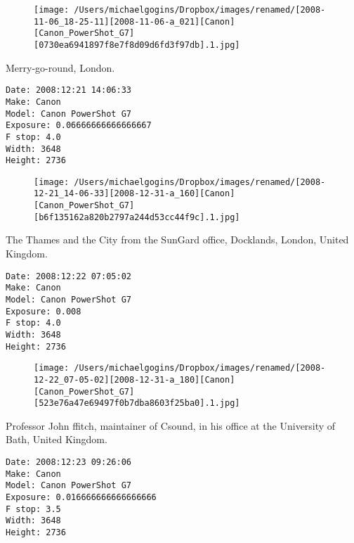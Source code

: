 \documentclass[11pt,letter,DIV=14,paper=landscape]{scrbook}
\begin{document}
\begin{figure}
\texttt{[image: /Users/michaelgogins/Dropbox/images/renamed/[2008-11-06\_18-25-11][2008-11-06-a\_021][Canon][Canon\_PowerShot\_G7][0730ea6941897f8e7f8d09d6fd3f97db].1.jpg]}
\end{figure}
    
\clearpage
\noindent Merry-go-round, London.
\noindent
\begin{lstlisting}
Date: 2008:12:21 14:06:33
Make: Canon
Model: Canon PowerShot G7
Exposure: 0.06666666666666667
F stop: 4.0
Width: 3648
Height: 2736
\end{lstlisting}
\clearpage

\begin{figure}
\texttt{[image: /Users/michaelgogins/Dropbox/images/renamed/[2008-12-21\_14-06-33][2008-12-31-a\_160][Canon][Canon\_PowerShot\_G7][b6f135162a820b2797a244d53cc44f9c].1.jpg]}
\end{figure}
    
\clearpage
\noindent The Thames and the City from the SunGard office, Docklands, London, United Kingdom.
\noindent
\begin{lstlisting}
Date: 2008:12:22 07:05:02
Make: Canon
Model: Canon PowerShot G7
Exposure: 0.008
F stop: 4.0
Width: 3648
Height: 2736
\end{lstlisting}
\clearpage

\begin{figure}
\texttt{[image: /Users/michaelgogins/Dropbox/images/renamed/[2008-12-22\_07-05-02][2008-12-31-a\_180][Canon][Canon\_PowerShot\_G7][523e76a47e69497f0b7dba8603f25ba0].1.jpg]}
\end{figure}
    
\clearpage
\noindent Professor John ffitch, maintainer of Csound, in his office at the University of Bath, United Kingdom.
\noindent
\begin{lstlisting}
Date: 2008:12:23 09:26:06
Make: Canon
Model: Canon PowerShot G7
Exposure: 0.016666666666666666
F stop: 3.5
Width: 3648
Height: 2736
\end{lstlisting}
\clearpage
\end{document}
